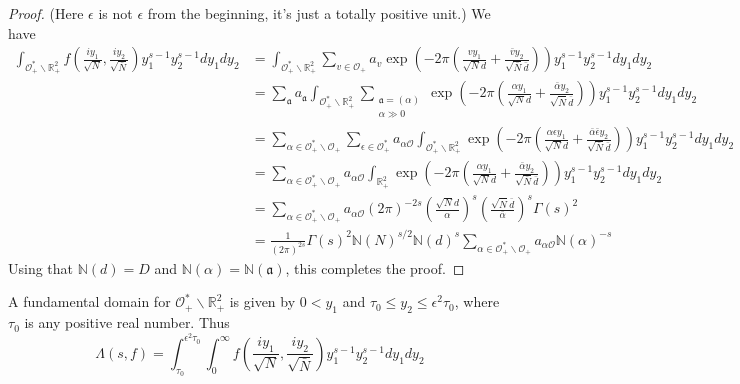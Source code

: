 \documentclass{article}
\theoremstyle{plain}
\begin{document}
\begin{proof}
(Here $\epsilon$ is not $\epsilon$ from the beginning, it's just a totally positive unit.) We have
\begin{align*}
\int_{\mathcal{O}_+^*\backslash \mathbb{R}^2_+} f\left(\frac{iy_1}{\sqrt{N}},\frac{iy_2}{\sqrt{\bar{N}}}\right) y_1^{s-1}y_2^{s-1} dy_1 dy_2 &= \int_{\mathcal{O}_+^*\backslash \mathbb{R}^2_+} \sum_{v \in \mathcal{O}_+} a_v \exp\left( -2\pi \left(\frac{vy_1}{\sqrt{N} d}+\frac{\bar{v} y_2}{\sqrt{\bar{N}}\bar{d}}  \right)\right) y_1^{s-1}y_2^{s-1} dy_1 dy_2\\
&= \sum_{\mathfrak{a}} a_{\mathfrak{a}} \int_{\mathcal{O}_+^*\backslash \mathbb{R}^2_+} \sum_{\substack{\mathfrak{a}=(\alpha)\\ \alpha \gg 0 }} \exp\left( -2\pi \left(\frac{\alpha y_1}{\sqrt{N} d}+\frac{\bar{\alpha} y_2}{\sqrt{\bar{N}}\bar{d}}  \right)\right)  y_1^{s-1}y_2^{s-1} dy_1 dy_2\\
& = \sum_{\alpha \in \mathcal{O}_+^* \backslash \mathcal{O}_+} \sum_{\epsilon \in \mathcal{O}_+^*} a_{\alpha \mathcal{O}} \int_{\mathcal{O}_+^*\backslash \mathbb{R}^2_+} \exp\left( -2\pi \left(\frac{\alpha \epsilon y_1}{\sqrt{N} d}+\frac{\bar{\alpha}\bar{\epsilon} y_2}{\sqrt{\bar{N}}\bar{d}}  \right)\right) y_1^{s-1}y_2^{s-1} dy_1 dy_2\\
& = \sum_{\alpha \in \mathcal{O}_+^* \backslash \mathcal{O}_+} a_{\alpha \mathcal{O}} \int_{\mathbb{R}^2_+} \exp\left( -2\pi \left(\frac{\alpha y_1}{\sqrt{N} d}+\frac{\bar{\alpha} y_2}{\sqrt{\bar{N}}\bar{d}}  \right)\right) y_1^{s-1}y_2^{s-1} dy_1 dy_2\\
&= \sum_{\alpha \in \mathcal{O}_+^* \backslash \mathcal{O}_+} a_{\alpha \mathcal{O}} (2 \pi)^{-2s} \left(\frac{\sqrt{N}d}{\alpha}\right)^s\left(\frac{\sqrt{\bar{N}}\bar{d}}{\bar{\alpha}}\right)^s \Gamma(s)^2\\
&= \frac{1}{(2\pi)^{2s}} \Gamma(s)^2 \mathbb{N}(N)^{s/2} \mathbb{N}(d)^s \sum_{\alpha \in \mathcal{O}_+^* \backslash \mathcal{O}_+} a_{\alpha \mathcal{O}} \mathbb{N}(\alpha)^{-s}  
\end{align*}
Using that  $\mathbb{N}(d)=D$ and $\mathbb{N}(\alpha)= \mathbb{N}(\mathfrak{a})$, this completes the proof.
\end{proof}

A fundamental domain for $\mathcal{O}_+^*\backslash \mathbb{R}^2_+$ is given by $0<y_1$ and $\tau_0 \leq y_2 \leq \epsilon^2 \tau_0$, where $\tau_0$ is any positive real number. Thus
\begin{equation*}
\Lambda(s,f)= \int_{\tau_0}^{\epsilon^2 \tau_0}\int_{0}^{\infty} f\left(\frac{iy_1}{\sqrt{N}},\frac{iy_2}{\sqrt{\bar{N}}}\right) y_1^{s-1}y_2^{s-1} dy_1 dy_2
\end{equation*}
\end{document}
